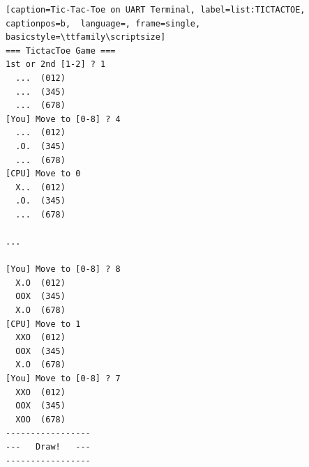 \begin{lstlisting}[caption=Tic-Tac-Toe on UART Terminal, label=list:TICTACTOE, captionpos=b,  language=, frame=single, basicstyle=\ttfamily\scriptsize]
=== TictacToe Game ===
1st or 2nd [1-2] ? 1
  ...  (012)
  ...  (345)
  ...  (678)
[You] Move to [0-8] ? 4
  ...  (012)
  .O.  (345)
  ...  (678)
[CPU] Move to 0
  X..  (012)
  .O.  (345)
  ...  (678)

...

[You] Move to [0-8] ? 8
  X.O  (012)
  OOX  (345)
  X.O  (678)
[CPU] Move to 1
  XXO  (012)
  OOX  (345)
  X.O  (678)
[You] Move to [0-8] ? 7
  XXO  (012)
  OOX  (345)
  XOO  (678)
-----------------
---   Draw!   ---
-----------------
\end{lstlisting}




